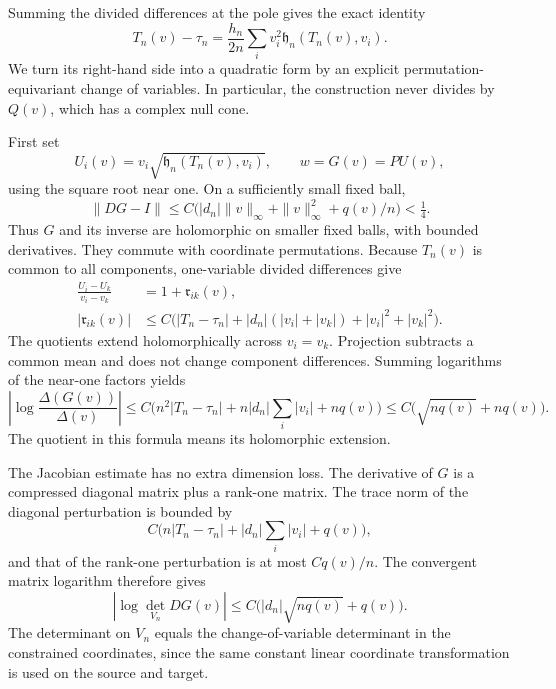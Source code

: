 \documentclass[11pt]{article}
\numberwithin{equation}{section}
\theoremstyle{definition}
\begin{document}
Summing the divided differences at the pole gives the exact identity
\begin{equation}
 T_n(v)-\tau_n
   =\frac{h_n}{2n}
       \sum_i v_i^2\mathfrak h_n(T_n(v),v_i).
 \label{neg:separable-energy}
\end{equation}
We turn its right-hand side into a quadratic form by an explicit
permutation-equivariant change of variables.  In particular, the
construction never divides by \(Q(v)\), which has a complex null
cone.

First set
\begin{equation}
 U_i(v)=v_i\sqrt{\mathfrak h_n(T_n(v),v_i)},\qquad
 w=G(v)=P U(v),
 \label{neg:projected-map}
\end{equation}
using the square root near one.  On a sufficiently small fixed ball,
\[
 \|DG-I\|\le
 C\bigl(|d_n|\|v\|_\infty+\|v\|_\infty^2+q(v)/n\bigr)<\tfrac14 .
 \]
Thus \(G\) and its inverse are holomorphic on smaller fixed balls,
with bounded derivatives.  They commute with coordinate
permutations.  Because \(T_n(v)\) is common to all components,
one-variable divided differences give
\begin{align}
 \frac{U_i-U_k}{v_i-v_k}&=1+\mathfrak r_{ik}(v),\\
 |\mathfrak r_{ik}(v)|
 &\le C\bigl(
 |T_n-\tau_n|+|d_n|(|v_i|+|v_k|)
                   +|v_i|^2+|v_k|^2\bigr).
 \label{neg:pair-divided}
\end{align}
The quotients extend holomorphically across \(v_i=v_k\).
Projection subtracts a common mean and does not change
component differences.  Summing logarithms of the near-one
factors yields
\begin{equation}
 \left|\log\frac{\Delta(G(v))}{\Delta(v)}\right|
 \le C\bigl(n^2|T_n-\tau_n|
              +n|d_n|\sum_i|v_i|+nq(v)\bigr)
 \le C\bigl(\sqrt{nq(v)}+nq(v)\bigr).
 \label{neg:G-vandermonde}
\end{equation}
The quotient in this formula means its holomorphic extension.

The Jacobian estimate has no extra dimension loss.  The
derivative of \(G\) is a compressed diagonal matrix plus a
rank-one matrix.  The trace norm of the diagonal perturbation
is bounded by
\[
 C\bigl(n|T_n-\tau_n|+|d_n|\sum_i|v_i|+q(v)\bigr),
 \]
and that of the rank-one perturbation is at most \(Cq(v)/n\).
The convergent matrix logarithm therefore gives
\begin{equation}
 |\log\det_{V_n}DG(v)|
 \le C\bigl(|d_n|\sqrt{nq(v)}+q(v)\bigr).
 \label{neg:G-jacobian}
\end{equation}
The determinant on \(V_n\) equals the change-of-variable
determinant in the constrained coordinates, since the same
constant linear coordinate transformation is used on the
source and target.
\end{document}
